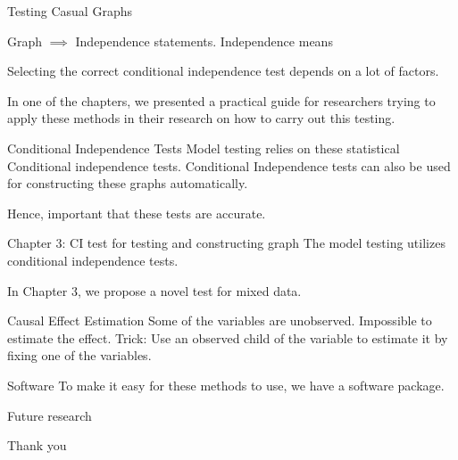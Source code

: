 \documentclass[aspectratio=169]{beamer}
\begin{document}
\begin{frame}{Testing Casual Graphs}

	Graph $ \implies $ Independence statements.
	Independence means 

	Selecting the correct conditional independence test depends on a lot of factors.

	In one of the chapters, we presented a practical guide for researchers trying to apply these methods in their research on how to carry out this testing.
\end{frame}

\begin{frame}{Conditional Independence Tests}
	Model testing relies on these statistical Conditional independence tests.
	Conditional Independence tests can also be used for constructing these graphs
	automatically.

	Hence, important that these tests are accurate.
\end{frame}

\begin{frame}{Chapter 3: CI test for testing and constructing graph}
	The model testing utilizes conditional independence tests.

	In Chapter 3, we propose a novel test for mixed data.
\end{frame}

\begin{frame}{Causal Effect Estimation}
	Some of the variables are unobserved.
	Impossible to estimate the effect.
	Trick: Use an observed child of the variable to estimate it by fixing one of the
	variables.
\end{frame}

\begin{frame}{Software}
	To make it easy for these methods to use, we have a software package.
\end{frame}

\begin{frame}{Future research}
\end{frame}

\begin{frame}
	\Huge{Thank you}
\end{frame}
\end{document}
